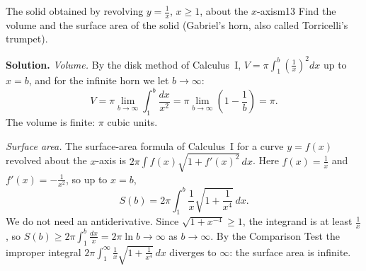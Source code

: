 \documentclass[11pt]{article}
\begin{document}
\begin{exmp}{The solid obtained by revolving $y=\frac1x$, $x\ge1$, about the $x$-axis}{m13}
Find the volume and the surface area of the solid (Gabriel's horn, also called Torricelli's trumpet).

\textbf{Solution.} \emph{Volume.} By the disk method of Calculus~I, $V=\pi\int_1^b\left(\frac1x\right)^2dx$ up to $x=b$, and for the infinite horn we let $b\to\infty$:
\[V=\pi\lim_{b\to\infty}\int_1^b\frac{dx}{x^2}=\pi\lim_{b\to\infty}\left(1-\frac1b\right)=\pi .\]
The volume is finite: $\pi$ cubic units.

\emph{Surface area.} The surface-area formula of Calculus~I for a curve $y=f(x)$ revolved about the $x$-axis is $2\pi\int f(x)\sqrt{1+f'(x)^2}\,dx$. Here $f(x)=\frac1x$ and $f'(x)=-\frac1{x^2}$, so up to $x=b$,
\[S(b)=2\pi\int_1^b\frac1x\sqrt{1+\frac1{x^4}}\,dx .\]
We do not need an antiderivative. Since $\sqrt{1+x^{-4}}\ge1$, the integrand is at least $\frac1x$, so $S(b)\ge2\pi\int_1^b\frac{dx}x=2\pi\ln b\to\infty$ as $b\to\infty$. By the Comparison Test the improper integral $2\pi\int_1^\infty\frac1x\sqrt{1+\frac1{x^4}}\,dx$ diverges to $\infty$: the surface area is infinite.


\end{exmp}
\end{document}
